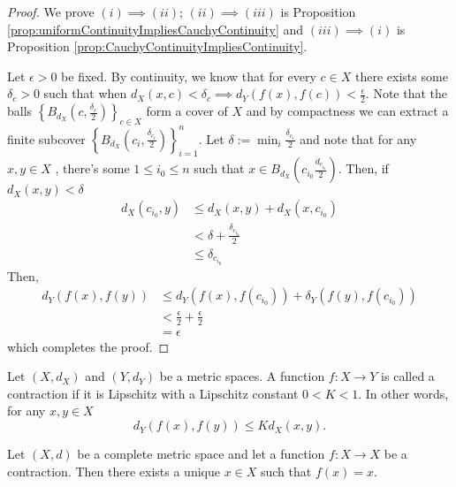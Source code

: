 \begin{proof}
We prove $(i)\implies(ii)$; $(ii)\implies(iii)$ is Proposition \ref{prop:uniformContinuityImpliesCauchyContinuity}
and $(iii)\implies(i)$ is Proposition \ref{prop:CauchyContinuityImpliesContinuity}.

Let $\epsilon>0$ be fixed. By continuity, we know that for every
$c\in X$ there exists some $\delta_{c}>0$ such that when $d_{X}\left(x,c\right)<\delta_{c}\implies d_{Y}\left(f\left(x\right),f\left(c\right)\right)<\frac{\epsilon}{2}$.
Note that the balls $\left\{ B_{d_{X}}\left(c,\frac{\delta_{c}}{2}\right)\right\} _{c\in X}$
form a cover of $X$ and by compactness we can extract a finite subcover
$\left\{ B_{d_{X}}\left(c_{i},\frac{\delta_{c_{i}}}{2}\right)\right\} _{i=1}^{n}$.
Let $\delta:=\min_{i}\frac{\delta_{c_{i}}}{2}$ and note that for
any $x,y\in X$ , there's some $1\leq i_{0}\leq n$ such that $x\in B_{d_{X}}\left(c_{i_{0}}\frac{d_{c_{i_{0}}}}{2}\right).$
Then, if $d_{X}\left(x,y\right)<\delta$
\begin{align*}
d_{X}\left(c_{i_{0}},y\right) & \leq d_{X}\left(x,y\right)+d_{X}\left(x,c_{i_{0}}\right)\\
 & <\delta+\frac{\delta_{c_{i_{0}}}}{2}\\
 & \leq\delta_{c_{i_{0}}}
\end{align*}
Then,
\begin{align*}
d_{Y}\left(f\left(x\right),f\left(y\right)\right) & \leq d_{Y}\left(f\left(x\right),f\left(c_{i_{0}}\right)\right)+\delta_{Y}\left(f\left(y\right),f\left(c_{i_{0}}\right)\right)\\
 & <\frac{\epsilon}{2}+\frac{\epsilon}{2}\\
 & =\epsilon
\end{align*}
which completes the proof.
\end{proof}
\begin{defn}
Let $\left(X,d_{X}\right)$ and $\left(Y,d_{Y}\right)$ be a metric
spaces. A function $f:X\to Y$ is called a contraction if it is Lipschitz
with a Lipschitz constant $0<K<1$. In other words, for any $x,y\in X$
\[
d_{Y}\left(f\left(x\right),f\left(y\right)\right)\leq Kd_{X}\left(x,y\right).
\]
\end{defn}

\begin{thm}
\label{thm:banachFixedPoint}Let $\left(X,d\right)$ be a complete
metric space and let a function $f:X\to X$ be a contraction. Then
there exists a unique $x\in X$ such that $f\left(x\right)=x$.
\end{thm}

